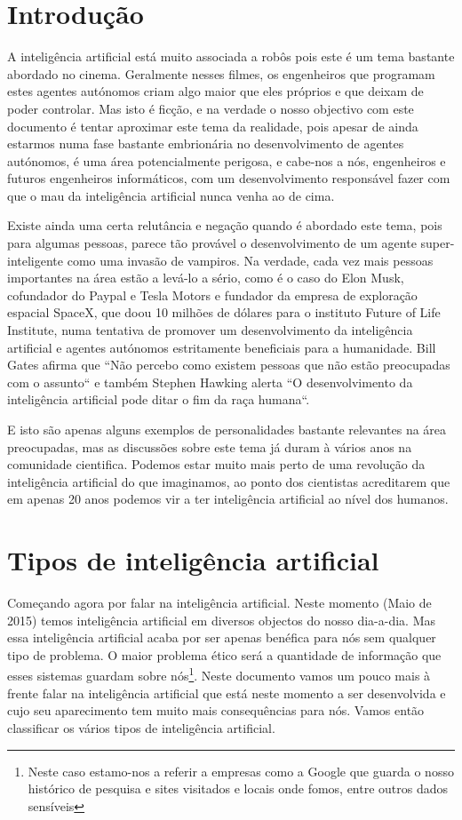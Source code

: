 \documentclass[runningheads,a4paper]{llncs}
\begin{document}
\section{Introdução}

A inteligência artificial está muito associada a robôs pois este é um tema bastante abordado no cinema. Geralmente nesses filmes, os engenheiros que programam estes agentes autónomos criam algo maior que eles próprios e que deixam de poder controlar. Mas isto é ficção, e na verdade o nosso objectivo com este documento é tentar aproximar este tema da realidade, pois apesar de ainda estarmos numa fase bastante embrionária no desenvolvimento de agentes autónomos, é uma área potencialmente perigosa, e cabe-nos a nós, engenheiros e futuros engenheiros informáticos, com um desenvolvimento responsável fazer com que o mau da inteligência artificial nunca venha ao de cima.

Existe ainda uma certa relutância e negação quando é abordado este tema, pois para algumas pessoas, parece tão provável o desenvolvimento de um agente super-inteligente como uma invasão de vampiros. Na verdade, cada vez mais pessoas importantes na área estão a levá-lo a sério, como é o caso do Elon Musk, cofundador do Paypal e Tesla Motors e fundador da empresa de exploração espacial SpaceX, que doou 10 milhões de dólares para o instituto Future of Life Institute\cite{FLI}, numa tentativa de promover um desenvolvimento da inteligência artificial e agentes autónomos estritamente beneficiais para a humanidade. Bill Gates afirma que ``Não percebo como existem pessoas que não estão preocupadas com o assunto``\cite{gates} e também Stephen Hawking alerta ``O desenvolvimento da inteligência artificial pode ditar o fim da raça humana``\cite{hawking}.

E isto são apenas alguns exemplos de personalidades bastante relevantes na área preocupadas, mas as discussões sobre este tema já duram à vários anos na comunidade cientifica. Podemos estar muito mais perto de uma revolução da inteligência artificial do que imaginamos, ao ponto dos cientistas acreditarem que em apenas 20 anos podemos vir a ter inteligência artificial ao nível dos humanos.

\section{Tipos de inteligência artificial}

Começando agora por falar na inteligência artificial. Neste momento (Maio de 2015) temos inteligência artificial em diversos objectos do nosso dia-a-dia. Mas essa inteligência artificial acaba por ser apenas benéfica para nós sem qualquer tipo de problema. O maior problema ético será a quantidade de informação que esses sistemas guardam sobre nós\footnote{Neste caso estamo-nos a referir a empresas como a Google que guarda o nosso histórico de pesquisa e sites visitados e locais onde fomos, entre outros dados sensíveis}. Neste documento vamos um pouco mais à frente falar na inteligência artificial que está neste momento a ser desenvolvida e cujo seu aparecimento tem muito mais consequências para nós. Vamos então classificar os vários tipos de inteligência artificial.
\end{document}
